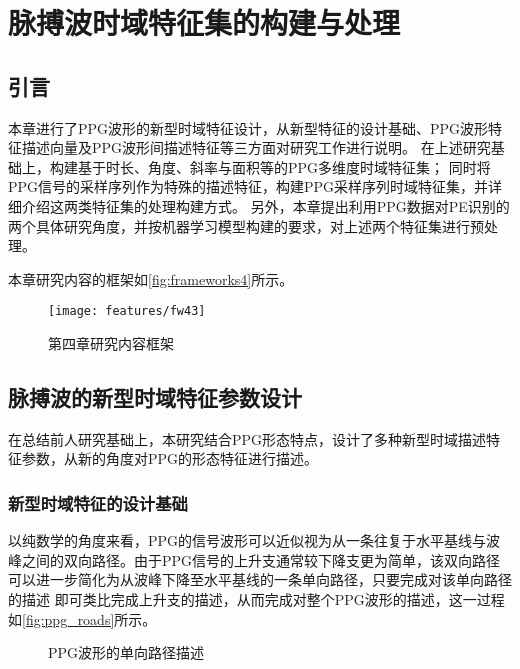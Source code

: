 \chapter{脉搏波时域特征集的构建与处理}
\section{引言}
本章进行了PPG波形的新型时域特征设计，从新型特征的设计基础、PPG波形特征描述向量及PPG波形间描述特征等三方面对研究工作进行说明。
在上述研究基础上，构建基于时长、角度、斜率与面积等的PPG多维度时域特征集；
同时将PPG信号的采样序列作为特殊的描述特征，构建PPG采样序列时域特征集，并详细介绍这两类特征集的处理构建方式。
另外，本章提出利用PPG数据对PE识别的两个具体研究角度，并按机器学习模型构建的要求，对上述两个特征集进行预处理。

本章研究内容的框架如\autoref{fig:frameworks4}所示。

\begin{figure}[htbp]
  \centering
  \texttt{[image: features/fw43]}
  \caption{\label{fig:frameworks4}第四章研究内容框架}
\end{figure}

\section{脉搏波的新型时域特征参数设计}
在总结前人研究基础上，本研究结合PPG形态特点，设计了多种新型时域描述特征参数，从新的角度对PPG的形态特征进行描述。

\subsection{新型时域特征的设计基础}

以纯数学的角度来看，PPG的信号波形可以近似视为从一条往复于水平基线与波峰之间的双向路径。由于PPG信号的上升支通常较下降支更为简单，该双向路径可以进一步简化为从波峰下降至水平基线的一条单向路径，只要完成对该单向路径的描述
即可类比完成上升支的描述，从而完成对整个PPG波形的描述，这一过程如\autoref{fig:ppg_roads}所示。

\begin{figure}[htbp]
  \centering
  \quad
  \caption{\label{fig:ppg_roads}PPG波形的单向路径描述}
\end{figure}

